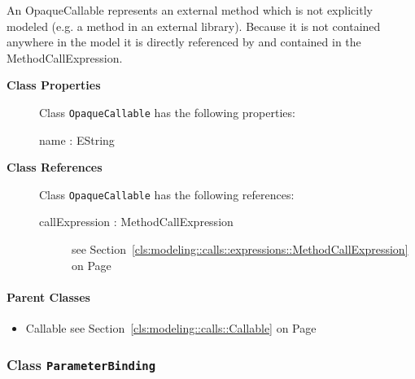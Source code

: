 	
			
An OpaqueCallable represents an external method which is not explicitly modeled (e.g. a method in an external library). Because it is not contained anywhere in the model it is directly referenced by and contained in the MethodCallExpression.	
			
	
		
	


\begin{description}

	\item[\textbf{Class Properties}] Class \texttt{OpaqueCallable} has the following properties:
	\begin{description}
\item[name : EString 	]
\hspace{\fill}
\nopagebreak


	
	\end{description}
	
	\item[\textbf{Class References}] Class \texttt{OpaqueCallable} has the following references:
	\begin{description}
\item[callExpression : MethodCallExpression 	]
see Section~\ref{cls:modeling::calls::expressions::MethodCallExpression} on Page~\pageref{cls:modeling::calls::expressions::MethodCallExpression}\hspace{\fill}
\nopagebreak


	
	\end{description}
	

\end{description}

\paragraph{Parent Classes}
\begin{itemize}
\item Callable see Section~\ref{cls:modeling::calls::Callable} on Page~\pageref{cls:modeling::calls::Callable}\end{itemize}
\subsubsection{\Large{Class \bfseries \texttt{ParameterBinding}\normalfont}}
\label{cls:modeling::calls::ParameterBinding} 
